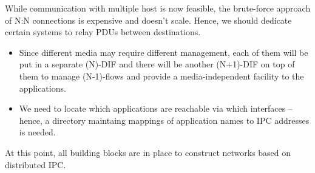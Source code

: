             While communication with multiple host is now feasible, the brute-force approach of N:N connections is expensive and doesn't scale. Hence, we should dedicate certain systems to relay PDUs between destinations.
            \vspace{300pt}
            \begin{itemize}
            \item Since different media may require different management, each of them will be put in a separate (N)-DIF and there will be another (N+1)-DIF on top of them to manage (N-1)-flows and provide a media-independent facility to the applications.
            \item We need to locate which applications are reachable via which interfaces -- hence, a directory maintaing mappings of application names to IPC addresses is needed.
            \end{itemize}

            At this point, all building blocks are in place to construct networks based on distributed IPC.








